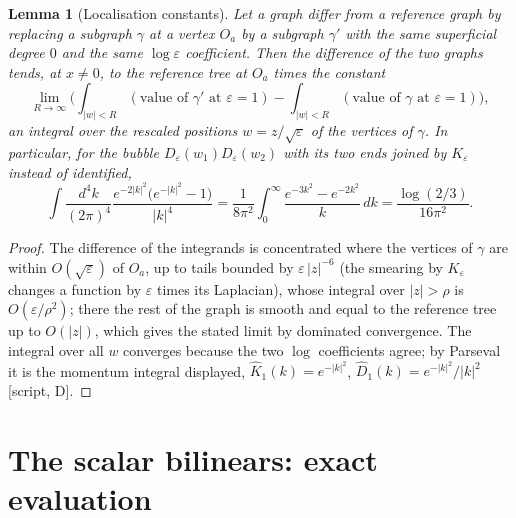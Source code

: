 \documentclass[11pt]{report}
\theoremstyle{plain}
\newtheorem{lemma}[theorem]{Lemma}
\theoremstyle{definition}
\numberwithin{equation}{chapter}
\begin{document}
\begin{lemma}[Localisation constants]
\label{lem:t-local}
Let a graph differ from a reference graph by replacing a subgraph $\gamma$ at a vertex $O_a$ by a subgraph $\gamma'$ with the same superficial degree $0$ and the same $\log\varepsilon$ coefficient. Then the difference of the two graphs tends, at $x\neq0$, to the reference tree at $O_a$ times the constant
\[
\lim_{R\to\infty}\Big(\int_{|w|<R}(\text{value of }\gamma'\text{ at }\varepsilon=1)-\int_{|w|<R}(\text{value of }\gamma\text{ at }\varepsilon=1)\Big),
\]
an integral over the rescaled positions $w=z/\sqrt\varepsilon$ of the vertices of $\gamma$. In particular, for the bubble $D_\varepsilon(w_1)D_\varepsilon(w_2)$ with its two ends joined by $K_\varepsilon$ instead of identified,
\[
\int\frac{d^4k}{(2\pi)^4}\frac{e^{-2|k|^2}\big(e^{-|k|^2}-1\big)}{|k|^4}=\frac{1}{8\pi^2}\int_0^\infty\frac{e^{-3k^2}-e^{-2k^2}}{k}\,dk=\frac{\log(2/3)}{16\pi^2}.
\]
\end{lemma}

\begin{proof}
The difference of the integrands is concentrated where the vertices of $\gamma$ are within $O(\sqrt\varepsilon)$ of $O_a$, up to tails bounded by $\varepsilon\,|z|^{-6}$ (the smearing by $K_\varepsilon$ changes a function by $\varepsilon$ times its Laplacian), whose integral over $|z|>\rho$ is $O(\varepsilon/\rho^2)$; there the rest of the graph is smooth and equal to the reference tree up to $O(|z|)$, which gives the stated limit by dominated convergence. The integral over all $w$ converges because the two $\log$ coefficients agree; by Parseval it is the momentum integral displayed, $\hat K_1(k)=e^{-|k|^2}$, $\hat D_1(k)=e^{-|k|^2}/|k|^2$ [script, D].
\end{proof}

\section{The scalar bilinears: exact evaluation}
\label{sec:t-example}
\end{document}
